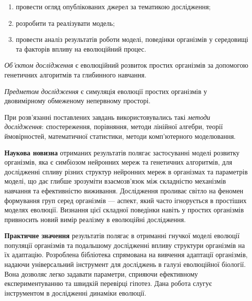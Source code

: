 \begin{enumerate}
\item провести огляд опублікованих джерел за тематикою дослідження;
\item розробити та реалізувати модель;
\item провести аналіз результатів роботи моделі, поведінки організмів у середовищі
  та факторів впливу на еволюційний процес.
\end{enumerate}

\emph{Об'єктом дослідження} є еволюційний розвиток простих організмів 
за допомогою генетичних алгоритмів та глибинного навчання.

\emph{Предметом дослідження} є симуляція еволюції простих організмів 
у двовимірному обмеженому непервному просторі.

При розв’язанні поставлених завдань використовувались такі \emph{методи дослідження}:
спостереження, порівняння,
методи лінійної алгебри, теорії ймовірностей, математичної статистики,
методи комп'ютерного моделювання.


\textbf{Наукова новизна} отриманих результатів полягає
застосуванні моделі розвитку організмів, яка є симбіозом
нейронних мереж та генетичних алгоритмів,
для дослідженні спливу різних структур нейронних мереж 
в організмах та параметрів моделі,
що дає глибше зрозуміти взаємозв'язок між складністю механізмів 
навчання та ефективністю виживання.
Дослідження проливає світло на феномен формування груп серед організмів 
--- аспект, який часто ігнорується в простіших моделях еволюції. 
Визнання цієї складної поведінки навіть у простих організмів привносить 
новий вимір реалізму в еволюційні дослідження.




\textbf{Практичне значення} результатів полягає в
отриманні гнучкої моделі еволюції популяції організмів та
подальшому дослідженні впливу структури організмів на їх адаптацію.
Розроблена бібліотека спрямована на вивчення адаптації організмів, 
надаючи універсальний інструмент для досліджень в галузі еволюційної біології. 
Вона дозволяє легко задавати параметри, 
сприяючи ефективному експериментуванню та швидкій перевірці гіпотез.
Дана робота слугує інструментом в дослідженні динаміки еволюції.

